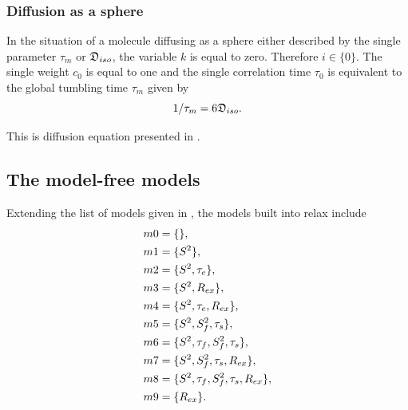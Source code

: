 \begin{htmlonly}
\begin{htmlonly}
\subsubsection{Diffusion as a sphere}

In the situation of a molecule diffusing as a sphere either described by the single parameter $\tau_m$ or $\mathfrak{D}_{iso}$, the variable $k$ is equal to zero.  Therefore $i \in \{0\}$.  The single weight $c_0$ is equal to one and the single correlation time $\tau_0$ is equivalent to the global tumbling time $\tau_m$ given by
\begin{equation} \label{eq: sphere tau0}
    1/\tau_m = 6\mathfrak{D}_{iso}.
\end{equation}

\noindent This is diffusion equation presented in \citet{Bloembergen48}.



\subsection{The model-free models}

Extending the list of models given in \citet{Mandel95, Fushman97, Orekhov99b, Korzhnev01, Zhuravleva04}, the models built into relax include
\begin{subequations}
\renewcommand{\theequation}{\theparentequation .\arabic{equation}}
\addtocounter{equation}{-1}
\begin{align}
 m0 &= \{\},                                   \label{model: m0} \\
 m1 &= \{S^2\},                                \label{model: m1} \\
 m2 &= \{S^2, \tau_e\},                        \label{model: m2} \\
 m3 &= \{S^2, R_{ex}\},                        \label{model: m3} \\
 m4 &= \{S^2, \tau_e, R_{ex}\},                \label{model: m4} \\
 m5 &= \{S^2, S^2_f, \tau_s\},                 \label{model: m5} \\
 m6 &= \{S^2, \tau_f, S^2_f, \tau_s\},         \label{model: m6} \\
 m7 &= \{S^2, S^2_f, \tau_s, R_{ex}\},         \label{model: m7} \\
 m8 &= \{S^2, \tau_f, S^2_f, \tau_s, R_{ex}\}, \label{model: m8} \\
 m9 &= \{R_{ex}\}.                             \label{model: m9}
\end{align}
\end{subequations}


\end{htmlonly}
\end{htmlonly}
